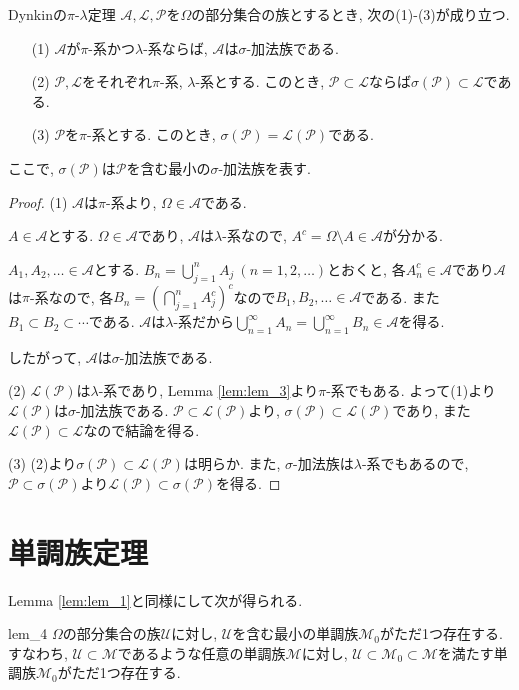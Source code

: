 \begin{theorem}{Dynkinの$\pi$-$\lambda$定理}{}
    $\mathcal{A},\mathcal{L},\mathcal{P}$を$\Omega$の部分集合の族とするとき, 次の(1)-(3)が成り立つ.
    \begin{itemize}
        \item[(1)] $\mathcal{A}$が$\pi$-系かつ$\lambda$-系ならば, $\mathcal{A}$は$\sigma$-加法族である.
        \item[(2)] $\mathcal{P},\mathcal{L}$をそれぞれ$\pi$-系, $\lambda$-系とする.
            このとき, $\mathcal{P}\subset\mathcal{L}$ならば$\sigma(\mathcal{P})\subset\mathcal{L}$である.
        \item[(3)] $\mathcal{P}$を$\pi$-系とする.
            このとき, $\sigma(\mathcal{P})=\mathcal{L}(\mathcal{P})$である.
    \end{itemize}
    ここで, $\sigma(\mathcal{P})$は$\mathcal{P}$を含む最小の$\sigma$-加法族を表す.
\end{theorem}
\begin{proof}
    (1) $\mathcal{A}$は$\pi$-系より, $\Omega\in\mathcal{A}$である.

    $A\in\mathcal{A}$とする.
    $\Omega\in\mathcal{A}$であり, $\mathcal{A}$は$\lambda$-系なので, $A^c=\Omega\setminus A\in\mathcal{A}$が分かる.

    $A_1,A_2,\dots\in\mathcal{A}$とする.
    $B_n=\bigcup_{j=1}^nA_j~(n=1,2,\dots)$とおくと, 各$A_n^c\in\mathcal{A}$であり$\mathcal{A}$は$\pi$-系なので, 各$B_n=(\bigcap_{j=1}^n A_j^c)^c$なので$B_1,B_2,\dots\in\mathcal{A}$である.
    また$B_1\subset B_2\subset\cdots$である.
    $\mathcal{A}$は$\lambda$-系だから$\bigcup_{n=1}^\infty A_n=\bigcup_{n=1}^\infty B_n\in\mathcal{A}$を得る.

    したがって, $\mathcal{A}$は$\sigma$-加法族である.

    (2) $\mathcal{L}(\mathcal{P})$は$\lambda$-系であり, Lemma \ref{lem:lem_3}より$\pi$-系でもある.
    よって(1)より$\mathcal{L}(\mathcal{P})$は$\sigma$-加法族である.
    $\mathcal{P}\subset \mathcal{L}(\mathcal{P})$より, $\sigma(\mathcal{P})\subset \mathcal{L}(\mathcal{P})$であり, また$\mathcal{L}(\mathcal{P})\subset\mathcal{L}$なので結論を得る.

    (3) (2)より$\sigma(\mathcal{P})\subset\mathcal{L}(\mathcal{P})$は明らか.
    また, $\sigma$-加法族は$\lambda$-系でもあるので, $\mathcal{P}\subset \sigma(\mathcal{P})$より$\mathcal{L}(\mathcal{P})\subset\sigma(\mathcal{P})$を得る.
\end{proof}

\section{単調族定理}
Lemma \ref{lem:lem_1}と同様にして次が得られる.
\begin{lemma}{}{lem_4}
    $\Omega$の部分集合の族$\mathcal{U}$に対し, $\mathcal{U}$を含む最小の単調族$\mathcal{M}_0$がただ1つ存在する.
    すなわち, $\mathcal{U}\subset \mathcal{M}$であるような任意の単調族$\mathcal{M}$に対し, $\mathcal{U}\subset \mathcal{M}_0\subset \mathcal{M}$を満たす単調族$\mathcal{M}_0$がただ1つ存在する.
\end{lemma}

